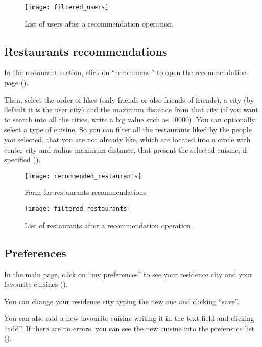 \begin{figure}[H]
	\texttt{[image: filtered\_users]}
	\caption{List of users after a recommendation operation.}\label{fig:filtered_users}
\end{figure}

\subsection{Restaurants recommendations}

In the restaurant section, click on ``recommend'' to open the recommendation
page ().

Then, select the order of likes (only friends or also friends of friends), a
city (by default it is the user city) and the maximum distance from that city
(if you want to search into all the cities, write a big value such as
\(10000\)). You can optionally select a type of cuisine. So you can filter all
the restaurants liked by the people you selected, that you are not already like,
which are located into a circle with center city and radius maximum distance,
that present the selected cuisine, if specified
().

\begin{figure}[H]
	\texttt{[image: recommended\_restaurants]}
	\caption{Form for restaurants recommendations.}\label{fig:recommended_restaurants}
\end{figure}

\begin{figure}[H]
	\texttt{[image: filtered\_restaurants]}
	\caption{List of restaurants after a recommendation operation.}\label{fig:filtered_restaurants}
\end{figure}

\subsection{Preferences}

In the main page, click on ``my preferences'' to see your residence city and
your favourite cuisines ().

You can change your residence city typing the new one and clicking ``save''.

You can also add a new favourite cuisine writing it in the text field and
clicking ``add''. If there are no errors, you can see the new cuisine into the
preference list ().

